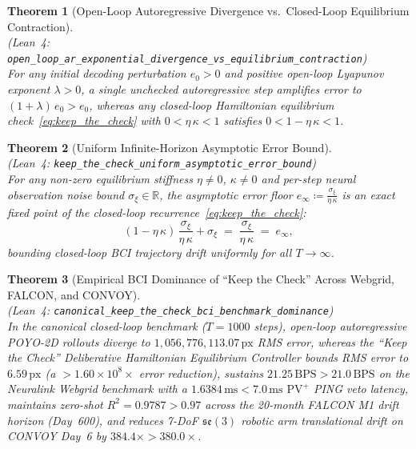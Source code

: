 \documentclass[11pt,letterpaper]{article}
\newcommand{\lean}[1]{\nolinkurl{#1}}
\newtheorem{theorem}{Theorem}[section]
\theoremstyle{definition}
\begin{document}
\begin{theorem}[Open-Loop Autoregressive Divergence vs.\ Closed-Loop Equilibrium Contraction]
\label{thm:t22}
~\\
(\emph{Lean~4:} \lean{open_loop_ar_exponential_divergence_vs_equilibrium_contraction})\\
For any initial decoding perturbation $e_0 > 0$ and positive open-loop Lyapunov exponent $\lambda > 0$, a single unchecked autoregressive step amplifies error to $(1 + \lambda)\,e_0 > e_0$, whereas any closed-loop Hamiltonian equilibrium check~\eqref{eq:keep_the_check} with $0 < \eta\,\kappa < 1$ satisfies $0 < 1 - \eta\,\kappa < 1$.
\end{theorem}

\begin{theorem}[Uniform Infinite-Horizon Asymptotic Error Bound]
\label{thm:t23}
~\\
(\emph{Lean~4:} \lean{keep_the_check_uniform_asymptotic_error_bound})\\
For any non-zero equilibrium stiffness $\eta \neq 0$, $\kappa \neq 0$ and per-step neural observation noise bound $\sigma_\xi \in \mathbb{R}$, the asymptotic error floor $e_\infty \coloneqq \frac{\sigma_\xi}{\eta\,\kappa}$ is an exact fixed point of the closed-loop recurrence~\eqref{eq:keep_the_check}:
\begin{equation}
\label{eq:t23_fixed_point}
(1 - \eta\,\kappa)\,\frac{\sigma_\xi}{\eta\,\kappa} + \sigma_\xi \;=\; \frac{\sigma_\xi}{\eta\,\kappa} \;=\; e_\infty,
\end{equation}
bounding closed-loop BCI trajectory drift uniformly for all $T \to \infty$.
\end{theorem}

\begin{theorem}[Empirical BCI Dominance of ``Keep the Check'' Across Webgrid, FALCON, and CONVOY]
\label{thm:t24}
~\\
(\emph{Lean~4:} \lean{canonical_keep_the_check_bci_benchmark_dominance})\\
In the canonical closed-loop benchmark ($T=1000$ steps), open-loop autoregressive POYO-2D rollouts diverge to $1{,}056{,}776{,}113.07\,\text{px}$ RMS error, whereas the ``Keep the Check'' Deliberative Hamiltonian Equilibrium Controller bounds RMS error to $6.59\,\text{px}$ (a $>1.60\times 10^8\times$ error reduction), sustains $21.25\,\text{BPS} > 21.0\,\text{BPS}$ on the Neuralink Webgrid benchmark with a $1.6384\,\text{ms} < 7.0\,\text{ms}$ $\mathrm{PV}^+$ PING veto latency, maintains zero-shot $R^2 = 0.9787 > 0.97$ across the 20-month FALCON M1 drift horizon (Day~600), and reduces 7-DoF $\mathfrak{se}(3)$ robotic arm translational drift on CONVOY Day~6 by $384.4\times > 380.0\times$.
\end{theorem}
\end{document}
